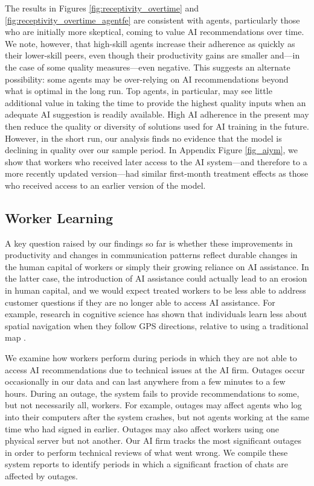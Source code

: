 \documentclass[11pt]{article}
\begin{document}
The results in Figures \ref{fig:receptivity_overtime} and \ref{fig:receptivity_overtime_agentfe} are consistent with agents, particularly those who are initially more skeptical, coming to value AI recommendations over time.  We note, however, that high-skill agents increase their adherence as quickly as their lower-skill peers, even though their productivity gains are smaller and---in the case of some quality measures---even negative.  This suggests an alternate possibility: some agents may be over-relying on AI recommendations beyond what is optimal in the long run. Top agents, in particular, may see little additional value in taking the time to provide the highest quality inputs when an adequate AI suggestion is readily available.  High AI adherence in the present may then reduce the quality or diversity of solutions used for AI training in the future.  However, in the short run, our analysis finds no evidence that the model is declining in quality over our sample period. In Appendix Figure \ref{fig_aiym}, we show that workers who received later access to the AI system---and therefore to a more recently updated version---had similar first-month treatment effects as those who received access to an earlier version of the model. 


\subsection{Worker Learning} \label{sec:learning}

A key question raised by our findings so far is whether these improvements in productivity and changes in communication patterns reflect durable changes in the human capital of workers or simply their growing reliance on AI assistance.  In the latter case, the introduction of AI assistance could actually lead to an erosion in human capital, and we would expect treated workers to be less able to address customer questions if they are no longer able to access AI assistance. For example, research in cognitive science has shown that individuals learn less about spatial navigation when they follow GPS directions, relative to using a traditional map \citep{Brügger2019}.

We examine how workers perform during periods in which they are not able to access AI recommendations due to technical issues at the AI firm.  Outages occur occasionally in our data and can last anywhere from a few minutes to a few hours.  During an outage, the system fails to provide recommendations to some, but not necessarily all, workers.  For example, outages may affect agents who log into their computers after the system crashes, but not agents working at the same time who had signed in earlier. Outages may also affect workers using one physical server but not another. Our AI firm tracks the most significant outages in order to perform technical reviews of what went wrong.  We compile these system reports to identify periods in which a significant fraction of chats are affected by outages.
\end{document}
